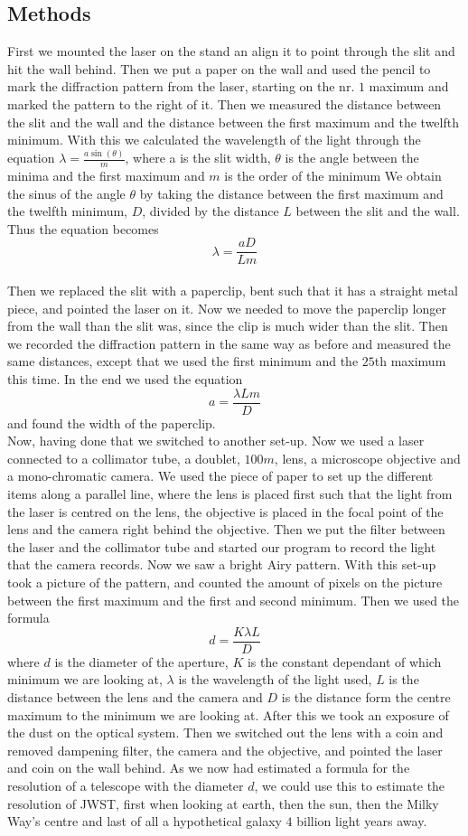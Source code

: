\documentclass[11pt, A4paper, english]{article}
\begin{document}
\begin{multicols}{2}
		\section{Methods}
First we mounted the laser on the stand an align it to point through the slit and hit the wall behind. Then we put a paper on the wall and used the pencil to mark the diffraction pattern from the laser, starting on the nr. $1$ maximum and marked the pattern to the right of it. Then we measured the distance between the slit and the wall and the distance between the first maximum and the twelfth minimum. With this we calculated the wavelength of the light through the equation $\lambda = \frac{a \sin(\theta)}{m}$, where a is the slit width, $\theta$ is the angle between the minima and the first maximum and $m$ is the order of the minimum We obtain the sinus of the angle $\theta$ by taking the distance between the first maximum and the twelfth minimum, $D$, divided by the distance $L$ between the slit and the wall. Thus the equation becomes
$$\lambda = \frac{a D}{Lm}$$
\\
Then we replaced the slit with a paperclip, bent such that it has a straight metal piece, and pointed the laser on it. Now we needed to move the paperclip longer from the wall than the slit was, since the clip is much wider than the slit. Then we recorded the diffraction pattern in the same way as before and measured the same distances, except that we used the first minimum and the $25$th maximum this time. In the end we used the equation
$$a = \frac{\lambda L m}{D}$$
and found the width of the paperclip.
\\
Now, having done that we switched to another set-up. Now we used a laser connected to a collimator tube, a doublet, $100 m$, lens, a microscope objective and a mono-chromatic camera. We used the piece of paper to set up the different items along a parallel line, where the lens is placed first such that the light from the laser is centred on the lens, the objective is placed in the focal point of the lens and the camera right behind the objective. Then we put the filter between the laser and the collimator tube and started our program to record the light that the camera records. Now we saw a bright Airy pattern. With this set-up took a picture of the pattern, and counted the amount of pixels on the picture between the first maximum and the first and second minimum. Then we used the formula 
$$d = \frac{K \lambda L}{D}$$
where $d$ is the diameter of the aperture, $K$ is the constant dependant of which minimum we are looking at, $\lambda$ is the wavelength of the light used, $L$ is the distance between the lens and the camera and $D$ is the distance form the centre maximum to the minimum we are looking at. After this we took an exposure of the dust on the optical system. Then we switched out the lens with a coin and removed dampening filter, the camera and the objective, and pointed the laser and coin on the wall behind. As we now had estimated a formula for the resolution of a telescope with the diameter $d$, we could use this to estimate the resolution of JWST, first when looking at earth, then the sun, then the Milky Way's centre and last of all a hypothetical galaxy $4$ billion light years away.
	\end{multicols}
\end{document}
